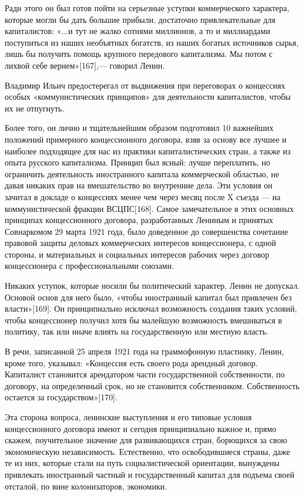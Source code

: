 \documentclass[12pt, a4paper, openany]{book}
\begin{document}
Ради этого он был готов пойти на серьезные уступки коммерческого характера, которые могли бы дать большие прибыли, достаточно привлекательные для капиталистов: «...и тут не жалко сотнями миллионов, а то и миллиардами поступиться из наших необъятных богатств, из наших богатых источников сырья, лишь бы получить помощь крупного передового капитализма. Мы потом с лихвой себе вернем»[167],— говорил Ленин.

Владимир Ильич предостерегал от выдвижения при переговорах о концессиях особых «коммунистических принципов» для деятельности капиталистов, чтобы их не отпугнуть.

Более того, он лично и тщательнейшим образом подготовил 10 важнейших положений примерного концессионного договора, взяв за основу все лучшее и наиболее подходящее для нас из практики капиталистических стран, а также из опыта русского капитализма. Принцип был ясный: лучше переплатить, но ограничить деятельность иностранного капитала коммерческой областью, не давая никаких прав на вмешательство во внутренние дела. Эти условия он зачитал в докладе о концессиях менее чем через месяц после X съезда — на коммунистической фракции ВСЦПС[168]. Самое замечательное в этих основных принципах концессионного договора, разработанных Лениным и принятых Совнаркомом 29 марта 1921 года, было доведенное до совершенства сочетание правовой защиты деловых коммерческих интересов концессионера, с одной стороны, и материальных и социальных интересов рабочих через договор концессионера с профессиональными союзами.

Никаких уступок, которые носили бы политический характер, Ленин не допускал. Основой основ для него было, «чтобы иностранный капитал был привлечен без власти»[169]. Он принципиально исключал возможность создания таких условий, чтобы концессионер получил хотя бы малейшую возможность вмешиваться в политику, так или иначе влиять на государственную или местную власть.

В речи, записанной 25 апреля 1921 года на граммофонную пластинку, Ленин, кроме того, указывал: «Концессия есть своего рода арендный договор. Капиталист становится арендатором части государственной собственности, по договору, на определенный срок, но не становится собственником. Собственность остается за государством»[170].

Эта сторона вопроса, ленинские выступления и его типовые условия концессионного договора имеют и сегодня принципиально важное и, прямо скажем, поучительное значение для развивающихся стран, борющихся за свою экономическую независимость. Естественно, что освободившиеся страны, даже те из них, которые стали на путь социалистической ориентации, вынуждены привлекать иностранный частный и государственный капитал для подъема своей отсталой, по вине колонизаторов, экономики.
\end{document}

